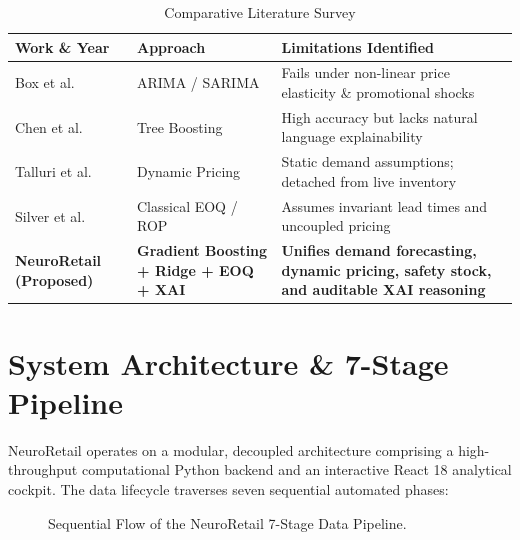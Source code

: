 \documentclass[conference]{IEEEtran}
\begin{document}
\begin{table}[htbp]
\caption{Comparative Literature Survey}
\begin{center}
\begin{tabular}{p{2.0cm}p{2.2cm}p{3.5cm}}
\toprule
\textbf{Work \& Year} & \textbf{Approach} & \textbf{Limitations Identified} \\
\midrule
Box et al. \cite{box2015} & ARIMA / SARIMA & Fails under non-linear price elasticity \& promotional shocks \\
\midrule
Chen et al. \cite{chen2016} & Tree Boosting & High accuracy but lacks natural language explainability \\
\midrule
Talluri et al. \cite{talluri2018} & Dynamic Pricing & Static demand assumptions; detached from live inventory \\
\midrule
Silver et al. \cite{silver2020} & Classical EOQ / ROP & Assumes invariant lead times and uncoupled pricing \\
\midrule
\textbf{NeuroRetail (Proposed)} & \textbf{Gradient Boosting + Ridge + EOQ + XAI} & \textbf{Unifies demand forecasting, dynamic pricing, safety stock, and auditable XAI reasoning} \\
\bottomrule
\end{tabular}
\label{tab:lit_survey}
\end{center}
\end{table}

\section{System Architecture \& 7-Stage Pipeline}
NeuroRetail operates on a modular, decoupled architecture comprising a high-throughput computational Python backend and an interactive React 18 analytical cockpit. The data lifecycle traverses seven sequential automated phases:

\begin{figure}[htbp]
\centering
{}
\caption{Sequential Flow of the NeuroRetail 7-Stage Data Pipeline.}
\label{fig:pipeline}
\end{figure}
\end{document}
